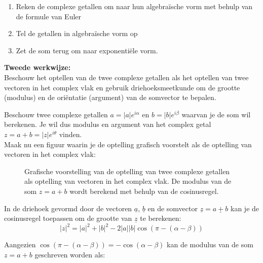 \begin{enumerate}
	\item Reken de complexe getallen om naar hun algebra\"{i}sche vorm met behulp van de formule van Euler
	\item Tel de getallen in algebra\"{i}sche vorm op
	\item Zet de som terug om naar exponenti\"{e}le vorm.
\end{enumerate}

\vspace{0.3cm}

{\bf Tweede werkwijze:} \\

Beschouw het optellen van de twee complexe getallen als het optellen van twee vectoren in het complex vlak en gebruik driehoeksmeetkunde om de grootte (modulus) en de ori\"{e}ntatie (argument) van de somvector te bepalen.\\

\vspace{0.3cm}

Beschouw twee complexe getallen $a=|a|e^{i\alpha}$ en $b=|b|e^{i\beta}$ waarvan je de som wil berekenen. Je wil dus modulus en argument van het complex getal $z=a+b=|z|e^{i\theta}$ vinden.\\
Maak nu een figuur waarin je de optelling grafisch voorstelt als de optelling van vectoren in het complex vlak:\\

\begin{figure}[H]
	\centering 
	 \caption{Grafische voorstelling van de optelling van twee complexe getallen als optelling van vectoren in het complex vlak. De modulus van de som $z=a+b$ wordt berekend met behulp van de cosinusregel.}
	
\end{figure}




In de driehoek gevormd door de vectoren $\underline{a}$, $\underline{b}$ en de somvector $\underline{z}=\underline{a+b}$ kan je de cosinusregel toepassen om de grootte van $\underline{z}$ te berekenen:\\

\[ |z|^2 =|a|^2 +|b|^2 -2|a||b|\cos(\pi-(\alpha-\beta))  \]

Aangezien $\cos(\pi-(\alpha-\beta))=-\cos(\alpha-\beta)$ kan de modulus van de som $z=a+b$ geschreven worden als:\\

